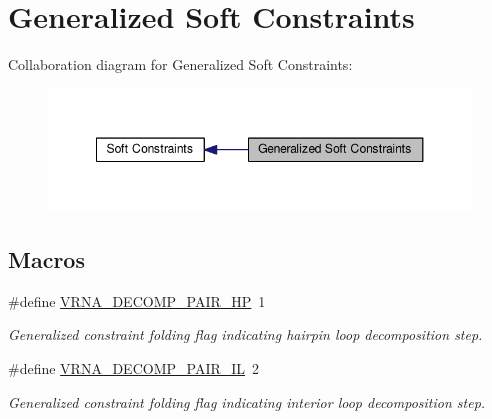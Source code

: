 \hypertarget{group__generalized__sc}{\section{Generalized Soft Constraints}
\label{group__generalized__sc}
}
Collaboration diagram for Generalized Soft Constraints\-:
\nopagebreak
\begin{figure}[H]
\begin{center}
\leavevmode
\includegraphics[width=348pt]{group__generalized__sc}
\end{center}
\end{figure}
\subsection*{Macros}
\begin{DoxyCompactItemize}
\item 
\hypertarget{group__generalized__sc_ga8bd41ebc8039378d242e4e8c273716a5}{\#define \hyperlink{group__generalized__sc_ga8bd41ebc8039378d242e4e8c273716a5}{V\-R\-N\-A\-\_\-\-D\-E\-C\-O\-M\-P\-\_\-\-P\-A\-I\-R\-\_\-\-H\-P}~1}\label{group__generalized__sc_ga8bd41ebc8039378d242e4e8c273716a5}

\begin{DoxyCompactList}\small\item\em Generalized constraint folding flag indicating hairpin loop decomposition step. \end{DoxyCompactList}\item 
\hypertarget{group__generalized__sc_gaeab04f34d7730cff2d651d782f95d857}{\#define \hyperlink{group__generalized__sc_gaeab04f34d7730cff2d651d782f95d857}{V\-R\-N\-A\-\_\-\-D\-E\-C\-O\-M\-P\-\_\-\-P\-A\-I\-R\-\_\-\-I\-L}~2}\label{group__generalized__sc_gaeab04f34d7730cff2d651d782f95d857}

\begin{DoxyCompactList}\small\item\em Generalized constraint folding flag indicating interior loop decomposition step. \end{DoxyCompactList}\end{DoxyCompactItemize}
